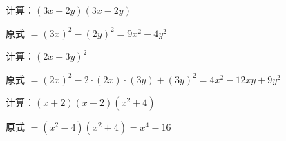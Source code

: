 \documentclass[a4paper,12pt]{ctexart}
\begin{document}

\begin{example}
计算：$(3x+2y)(3x-2y)$
\end{example}
\begin{solution}
原式 $=(3x)^2-(2y)^2=9x^2-4y^2$
\end{solution}

\begin{example}
计算：$(2x-3y)^2$
\end{example}
\begin{solution}
原式 $=(2x)^2-2\cdot(2x)\cdot(3y)+(3y)^2=4x^2-12xy+9y^2$
\end{solution}

\begin{example}
计算：$(x+2)(x-2)(x^2+4)$
\end{example}
\begin{solution}
原式 $=(x^2-4)(x^2+4)=x^4-16$
\end{solution}

\end{document}
